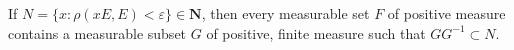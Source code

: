 If $N = \{x : \rho(xE, E) < \varepsilon\} \in \mathbf{N}$, then every measurable set $F$ of positive measure contains a measurable subset $G$ of positive, finite measure such that $GG^{-1} \subset N$.

